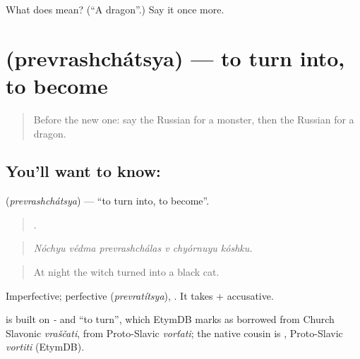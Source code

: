\begin{tcolorbox}[breakable,colback=teal!4,colframe=teal!35!black,title={Before you move on}]
What does  mean? (\textquotedblleft{}A dragon\textquotedblright{}.) Say it once more.
\end{tcolorbox}
\section[\texorpdfstring{\ru{превращаться} (prevrashchátsya)}{превращаться (prevrashchátsya)}]{ (prevrashchátsya) — to turn into, to become}

\label{lesson:RU-C320-prevrashchatsya}



\begin{quote}
Before the new one: say the Russian for a monster, then the Russian for a dragon.
\end{quote}

\subsection*{You'll want to know: }
\textbf{} (\emph{prevrashchátsya}) — \textquotedblleft{}to turn into, to become\textquotedblright{}.

\begin{quote}
     .
\end{quote}

\begin{quote}
\emph{Nóchyu védma prevrashchálas v chyórnuyu kóshku.}
\end{quote}

\begin{quote}
At night the witch turned into a black cat.
\end{quote}

Imperfective; perfective \emph{} (\emph{prevratítsya}), \emph{}. It takes \emph{} + accusative.

\begin{cousinweb}
\emph{} is built on \emph{-} and \emph{} \textquotedblleft{}to turn\textquotedblright{}, which EtymDB marks as borrowed from Church Slavonic \emph{vraščati}, from Proto-Slavic \emph{vorťati}; the native cousin is \emph{}, Proto-Slavic \emph{vortiti} (EtymDB).
\end{cousinweb}

